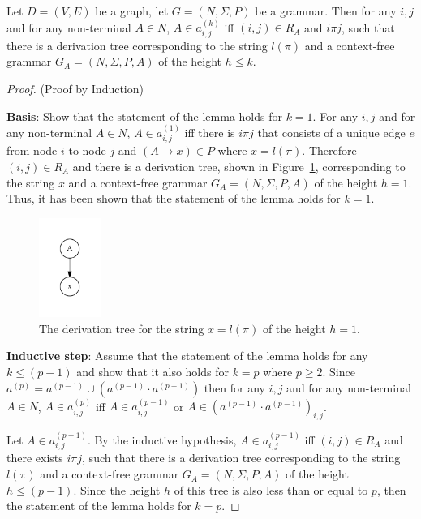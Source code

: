 \begin{lemma}\label{lemma:cf}
Let $D = (V,E)$ be a graph, let $G =(N,\Sigma,P)$ be a grammar. Then for any $i, j$ and for any non-terminal $A \in N$, $A \in a^{(k)}_{i,j}$ iff $(i,j) \in R_A$ and $i \pi j$, such that there is a derivation tree corresponding to the string $l(\pi)$ and a context-free grammar $G_A = (N,\Sigma,P,A)$ of the height $h \leq k$.
\end{lemma}
\begin{proof}(Proof by Induction)

\textbf{Basis}: Show that the statement of the lemma holds for $k = 1$. For any $i, j$ and for any non-terminal $A \in N$, $A \in a^{(1)}_{i,j}$ iff there is $i \pi j$ that consists of a unique edge $e$ from node $i$ to node $j$ and $(A \rightarrow x) \in P$ where $x = l(\pi)$. Therefore $(i,j) \in R_A$ and there is a derivation tree, shown in Figure~\ref{tree1}, corresponding to the string $x$ and a context-free grammar $G_A = (N,\Sigma,P,A)$ of the height $h = 1$. Thus, it has been shown that the statement of the lemma holds for $k = 1$.

\begin{figure}[h!]
 \centering
 \includegraphics[width=2cm]{pictures/tree1.pdf}
 \caption{The derivation tree for the string $x = l(\pi)$ of the height $h = 1$.}
 \label{tree1}
\end{figure}

\textbf{Inductive step}: Assume that the statement of the lemma holds for any $k \leq (p - 1)$ and show that it also holds for $k = p$ where $p \geq 2$. Since $a^{(p)} = a^{(p-1)} \cup (a^{(p-1)} \cdot a^{(p-1)})$ then for any $i, j$ and for any non-terminal $A \in N$, $A \in a^{(p)}_{i,j}$ iff $A \in a^{(p-1)}_{i,j}$ or $A \in (a^{(p-1)} \cdot a^{(p-1)})_{i,j}$.

Let $A \in a^{(p-1)}_{i,j}$. By the inductive hypothesis, $A \in a^{(p-1)}_{i,j}$ iff $(i,j) \in R_A$ and there exists $i \pi j$, such that there is a derivation tree corresponding to the string $l(\pi)$ and a context-free grammar $G_A = (N,\Sigma,P,A)$ of the height $h \leq (p-1)$. Since the height $h$ of this tree is also less than or equal to $p$, then the statement of the lemma holds for $k = p$.


\end{proof}
